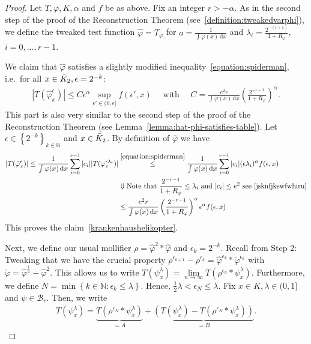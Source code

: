 \begin{proof}
  Let \( T, \varphi, K, \alpha \) and \( f \) be as above. Fix an integer \( r > -\alpha \). As in the second step of the proof of the Reconstruction Theorem (see~\eqref{definition:tweakedvarphi}), we define the tweaked test function \( \hat \varphi = T_\varphi \) for \(a = \frac{1}{\int \varphi(x) \, \mathrm{d}x}\) and \(\lambda_i = \frac{2^{-(i+1)}}{1+R_\varphi}\), \(i = 0,\ldots,r-1\). 
  
  We claim that \( \hat \varphi \) satisfies a slightly modified inequality~\eqref{equation:spiderman}, i.e.\ for all \( x \in \bar{K}_{2}, \epsilon = 2^{-k} \):
  \begin{align}\label{krankenhaushelikopter}
    | T(\hat \varphi^\epsilon_x)| \leq C \epsilon^\alpha \sup\limits_{\epsilon' \in (0, \epsilon]} f(\epsilon', x) \quad \text{ with } \quad C = \frac{e^2 r}{ \int \varphi(x) \, \mathrm{d}x} \left( \frac{2^{-r-1}}{1 + R_\varphi} \right)^\alpha.
  \end{align}
  This part is also very similar to the second step of the proof of the Reconstruction Theorem (see Lemma~\ref{lemma:hat-phi-satisfies-table}).
  Let \( \epsilon \in \left\{ 2^{-k} \right\}_{k \in \mathbb{N}} \) and \( x \in \bar{K}_{2} \). By definition of \( \hat \varphi \) we have
  \begin{align*} 
    |T( \hat \varphi^\epsilon_x )| 
    \leq \frac{1}{\int \varphi(x) \, \mathrm{d}x} \sum^{r-1}_{i=0} |c_i| |T(\varphi^{\epsilon\lambda_i}_{x})|
    &\overset{\eqref{equation:spiderman}}{\leq} \frac{1}{\int \varphi(x) \, \mathrm{d}x} \sum^{r-1}_{i=0} |c_i| (\epsilon \lambda_i)^{\alpha} f(\epsilon, x) \\
    &\Downarrow \text{Note that \( \frac{2^{-r - 1}}{1 + R_\varphi} \)} \leq \lambda_i \text{ and } |c_i| \leq e^2 \text{ see~\eqref{jsknfjkewfwhiru}} \\
    &\leq \frac{e^2r}{\int \varphi(x) \, \mathrm{d}x}  \left( \frac{2^{-r-1}}{1+R_\varphi} \right)^\alpha \epsilon^{\alpha} f(\epsilon, x)
  \end{align*}
  This proves the claim~\eqref{krankenhaushelikopter}.

  Next, we define our usual mollifier \( \rho = \hat \varphi^2 * \hat \varphi  \) and \( \epsilon_k = 2^{-k} \). Recall from Step 2: Tweaking that we have the crucial property \( \rho^{\epsilon_{k + 1}} - \rho^{\epsilon_k} = \hat \varphi^{\epsilon_k} * \check \varphi^{\epsilon_k} \) with \( \check \varphi = \hat \varphi^{\frac{1}{2}} - \hat \varphi^2 \). This allows us to write \( T(\psi^\lambda_x)  = \lim\limits_{n \to \infty} T (\rho^{\epsilon_n} * \psi^\lambda_x)\). Furthermore, we define \( N = \min\left\{ k \in \mathbb{N} : \epsilon_k \leq \lambda \right\} \). Hence, \( \frac{1}{2} \lambda < \epsilon_N \leq \lambda \). Fix \( x \in K, \lambda \in (0,1] \) and \( \psi \in \mathcal{B}_r \). Then, we write 
  \begin{align*}
    T(\psi^\lambda_x) = \underbrace{T(\rho^{\epsilon_N} * \psi^\lambda_x)}_{=A} + \underbrace{(T(\psi^\lambda_x) - T(\rho^{\epsilon_N} * \psi^\lambda_x))}_{=B}.
  \end{align*}


\end{proof}
